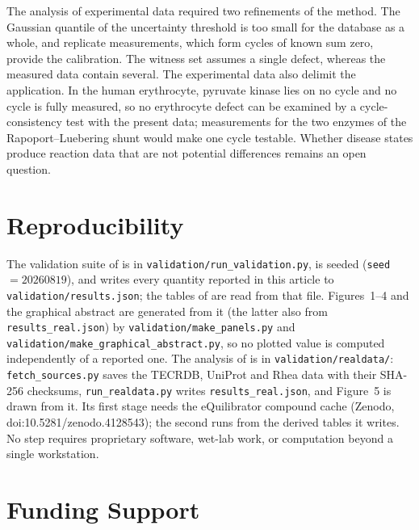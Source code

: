 \documentclass[11pt,a4paper]{article}
\theoremstyle{pstyle}
\theoremstyle{definition}
\theoremstyle{remark}
\begin{document}
The analysis of experimental data required two refinements of the
method. The Gaussian quantile of the uncertainty threshold is too small
for the database as a whole, and replicate measurements, which form
cycles of known sum zero, provide the calibration. The witness set
assumes a single defect, whereas the measured data contain several. The
experimental data also delimit the application. In the human
erythrocyte, pyruvate kinase lies on no cycle and no cycle is fully
measured, so no erythrocyte defect can be examined by a
cycle-consistency test with the present data; measurements for the two
enzymes of the Rapoport--Luebering shunt would make one cycle testable.
Whether disease states produce reaction data that are not potential
differences remains an open question.

\section*{Reproducibility}

The validation suite of  is in
\texttt{validation/run\_validation.py}, is seeded
(\texttt{seed}~$=20260819$), and writes every quantity reported in this
article to \texttt{validation/results.json}; the tables of
 are read from that file.
Figures~1--4 and the graphical abstract are generated from it (the
latter also from \texttt{results\_real.json}) by \texttt{validation/make\_panels.py} and
\texttt{validation/make\_graphical\_abstract.py}, so no plotted value is
computed independently of a reported one. The analysis of
 is in \texttt{validation/realdata/}:
\texttt{fetch\_sources.py} saves the TECRDB, UniProt and Rhea data with
their SHA-256 checksums, \texttt{run\_realdata.py} writes
\texttt{results\_real.json}, and Figure~5 is drawn from it. Its first
stage needs the eQuilibrator compound cache (Zenodo,
doi:10.5281/zenodo.4128543); the second runs from the derived tables it
writes. No step requires proprietary software, wet-lab work, or
computation beyond a single workstation.

\section*{Funding Support}
\end{document}
